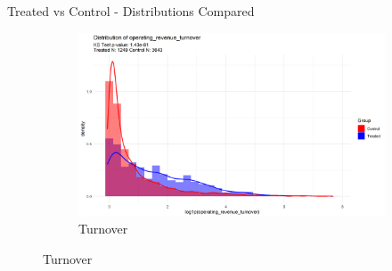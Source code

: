 \documentclass{beamer}
\begin{document}
\begin{frame}{Treated vs Control - Distributions Compared}
\begin{figure}[ht]
\begin{subfigure}[b]{0.45\textwidth}
            \end{subfigure}
            \hfill
            \begin{subfigure}[b]{0.45\textwidth}
                \centering
                \includegraphics[width=\linewidth]{../Output/distrib_compare_operating_revenue_turnover_allcountries.png}
                \caption{Turnover}

            \end{subfigure}
            \vspace{0.5cm}
        \end{figure}
\end{frame}
\end{document}
